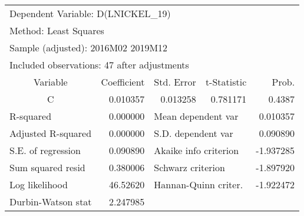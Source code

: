 \begin{tabular}{lrrrr}
\toprule
\multicolumn{3}{l}{Dependent Variable: D(LNICKEL\_19)}&\multicolumn{1}{c}{}&\multicolumn{1}{c}{}\\
\multicolumn{2}{l}{Method: Least Squares}&\multicolumn{1}{c}{}&\multicolumn{1}{c}{}&\multicolumn{1}{c}{}\\
\multicolumn{3}{l}{Sample (adjusted): 2016M02 2019M12}&\multicolumn{1}{c}{}&\multicolumn{1}{c}{}\\
\multicolumn{4}{l}{Included observations: 47 after adjustments}&\multicolumn{1}{c}{}\\
\midrule
\multicolumn{1}{c}{Variable}&\multicolumn{1}{r}{Coefficient}&\multicolumn{1}{r}{Std. Error}&\multicolumn{1}{r}{t-Statistic}&\multicolumn{1}{r}{Prob.}\\
\midrule
\multicolumn{1}{c}{C}&\multicolumn{1}{r}{0.010357}&\multicolumn{1}{r}{0.013258}&\multicolumn{1}{r}{0.781171}&\multicolumn{1}{r}{0.4387}\\
\midrule
\multicolumn{1}{l}{R-squared}&\multicolumn{1}{r}{0.000000}&\multicolumn{2}{l}{Mean dependent var}&\multicolumn{1}{r}{0.010357}\\
\multicolumn{1}{l}{Adjusted R-squared}&\multicolumn{1}{r}{0.000000}&\multicolumn{2}{l}{S.D. dependent var}&\multicolumn{1}{r}{0.090890}\\
\multicolumn{1}{l}{S.E. of regression}&\multicolumn{1}{r}{0.090890}&\multicolumn{2}{l}{Akaike info criterion}&\multicolumn{1}{r}{-1.937285}\\
\multicolumn{1}{l}{Sum squared resid}&\multicolumn{1}{r}{0.380006}&\multicolumn{2}{l}{Schwarz criterion}&\multicolumn{1}{r}{-1.897920}\\
\multicolumn{1}{l}{Log likelihood}&\multicolumn{1}{r}{46.52620}&\multicolumn{2}{l}{Hannan-Quinn criter.}&\multicolumn{1}{r}{-1.922472}\\
\multicolumn{1}{l}{Durbin-Watson stat}&\multicolumn{1}{r}{2.247985}&\multicolumn{1}{c}{}&\multicolumn{1}{c}{}&\multicolumn{1}{c}{}\\
\bottomrule
\end{tabular}
